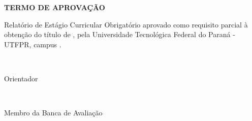 \makeatletter


\begin{center}
	\Large\textbf{\MakeUppercase{Termo de Aprovação}}
\end{center}

\begin{center}
	\large{\MakeUppercase{\@author}}
\end{center}

\vspace{2\baselineskip plus 1.5\baselineskip minus 0.5\baselineskip}

\begin{center}
	Relatório de Estágio Curricular Obrigatório aprovado como requisito parcial à obtenção do título de \MakeUppercase{\@titulo}, pela Universidade Tecnológica Federal do Paraná - UTFPR, campus \@cidade.
\end{center}

\vspace{2\baselineskip plus 1.5\baselineskip minus 0.5\baselineskip}

\begin{flushright}%
	\begin{minipage}{0.5\textwidth}%
		\@orientador\\\vspace{-0.5cm}
		\begin{flushright}
			Orientador
		\end{flushright}		
	\end{minipage}
\end{flushright}

\vspace{2\baselineskip plus 1.5\baselineskip minus 0.5\baselineskip}

\begin{flushright}%
	\begin{minipage}{0.5\textwidth}%
		\@avaliador\\\vspace{-0.5cm}
		\begin{flushright}
			Membro da Banca de Avaliação
		\end{flushright}		
	\end{minipage}
\end{flushright}

\vspace{2\baselineskip plus 1.5\baselineskip minus 0.5\baselineskip}


